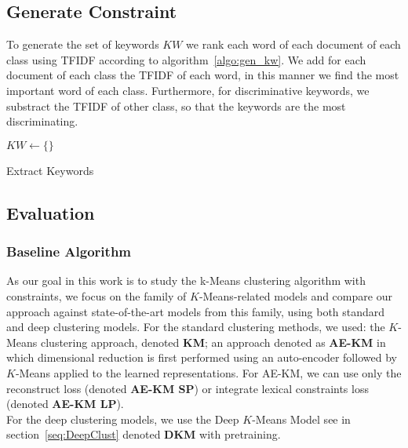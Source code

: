 \subsection{Generate Constraint}
To generate the set of keywords $KW$ we rank each word of each 
document of each class using TFIDF according to algorithm~\ref{algo:gen_kw}.
We add for each document of each class the TFIDF of each word, in this manner
we find the most important word of each class. Furthermore, for discriminative keywords,
we substract  the TFIDF of other class, so that the keywords are the most discriminating.
\begin{algorithm}
  $KW \gets \{\}$\\
  \caption{\label{algo:gen_kw}Extract Keywords}
\end{algorithm}
\subsection{Evaluation}
\subsubsection{Baseline Algorithm}
As our goal in this work is to study the k-Means clustering algorithm with 
constraints, we focus on the family of $K$-Means-related models and compare our 
approach against state-of-the-art models from this family, using both standard 
and deep clustering models. For the standard clustering methods, we used: the 
$K$-Means clustering approach, denoted \textbf{KM}; an approach denoted as \textbf{AE-KM} in which 
dimensional reduction is first performed using an auto-encoder followed by 
$K$-Means applied to the learned representations. For AE-KM, we can use only 
the reconstruct loss (denoted \textbf{AE-KM SP}) or integrate lexical constraints loss 
(denoted \textbf{AE-KM LP}).\\For the deep clustering models, we use the Deep $K$-Means 
Model see in section~\ref{seq:DeepClust} denoted \textbf{DKM} with pretraining.
